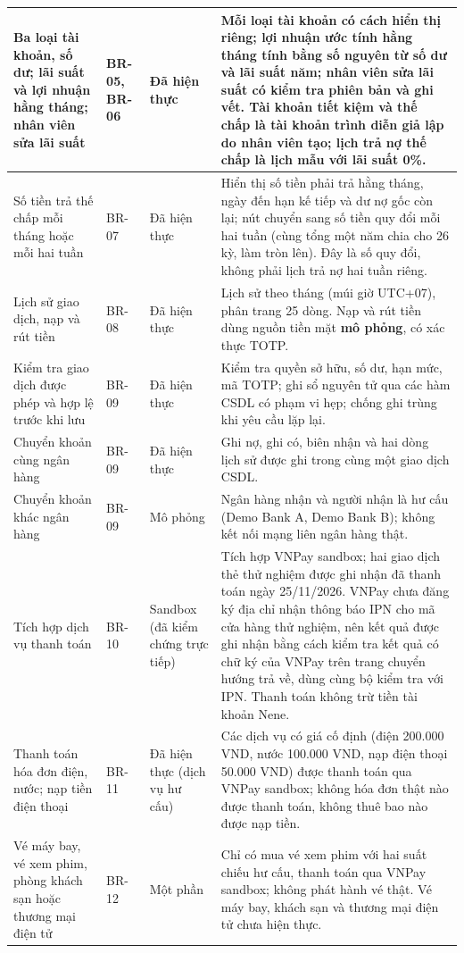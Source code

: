 \begin{longtable}{@{}p{3.3cm} p{1.5cm} p{2.4cm} p{7.0cm}@{}}
	\midrule
	Ba loại tài khoản, số dư; lãi suất và lợi nhuận hằng tháng; nhân viên sửa lãi suất & BR-05, BR-06 & Đã hiện thực & Mỗi loại tài khoản có cách hiển thị riêng; lợi nhuận ước tính hằng tháng tính bằng số nguyên từ số dư và lãi suất năm; nhân viên sửa lãi suất có kiểm tra phiên bản và ghi vết. Tài khoản tiết kiệm và thế chấp là tài khoản trình diễn giả lập do nhân viên tạo; lịch trả nợ thế chấp là lịch mẫu với lãi suất 0\%. \\
	\midrule
	Số tiền trả thế chấp mỗi tháng hoặc mỗi hai tuần & BR-07 & Đã hiện thực & Hiển thị số tiền phải trả hằng tháng, ngày đến hạn kế tiếp và dư nợ gốc còn lại; nút chuyển sang số tiền quy đổi mỗi hai tuần (cùng tổng một năm chia cho 26 kỳ, làm tròn lên). Đây là số quy đổi, không phải lịch trả nợ hai tuần riêng. \\
	\midrule
	Lịch sử giao dịch, nạp và rút tiền & BR-08 & Đã hiện thực & Lịch sử theo tháng (múi giờ UTC+07), phân trang 25 dòng. Nạp và rút tiền dùng nguồn tiền mặt \textbf{mô phỏng}, có xác thực TOTP. \\
	\midrule
	Kiểm tra giao dịch được phép và hợp lệ trước khi lưu & BR-09 & Đã hiện thực & Kiểm tra quyền sở hữu, số dư, hạn mức, mã TOTP; ghi sổ nguyên tử qua các hàm CSDL có phạm vi hẹp; chống ghi trùng khi yêu cầu lặp lại. \\
	\midrule
	Chuyển khoản cùng ngân hàng & BR-09 & Đã hiện thực & Ghi nợ, ghi có, biên nhận và hai dòng lịch sử được ghi trong cùng một giao dịch CSDL. \\
	\midrule
	Chuyển khoản khác ngân hàng & BR-09 & Mô phỏng & Ngân hàng nhận và người nhận là hư cấu (Demo Bank A, Demo Bank B); không kết nối mạng liên ngân hàng thật. \\
	\midrule
	Tích hợp dịch vụ thanh toán & BR-10 & Sandbox (đã kiểm chứng trực tiếp) & Tích hợp VNPay sandbox; hai giao dịch thẻ thử nghiệm được ghi nhận đã thanh toán ngày 25/11/2026. VNPay chưa đăng ký địa chỉ nhận thông báo IPN cho mã cửa hàng thử nghiệm, nên kết quả được ghi nhận bằng cách kiểm tra kết quả có chữ ký của VNPay trên trang chuyển hướng trả về, dùng cùng bộ kiểm tra với IPN. Thanh toán không trừ tiền tài khoản Nene. \\
	\midrule
	Thanh toán hóa đơn điện, nước; nạp tiền điện thoại & BR-11 & Đã hiện thực (dịch vụ hư cấu) & Các dịch vụ có giá cố định (điện 200.000 VND, nước 100.000 VND, nạp điện thoại 50.000 VND) được thanh toán qua VNPay sandbox; không hóa đơn thật nào được thanh toán, không thuê bao nào được nạp tiền. \\
	\midrule
	Vé máy bay, vé xem phim, phòng khách sạn hoặc thương mại điện tử & BR-12 & Một phần & Chỉ có mua vé xem phim với hai suất chiếu hư cấu, thanh toán qua VNPay sandbox; không phát hành vé thật. Vé máy bay, khách sạn và thương mại điện tử chưa hiện thực. \\

\end{longtable}
